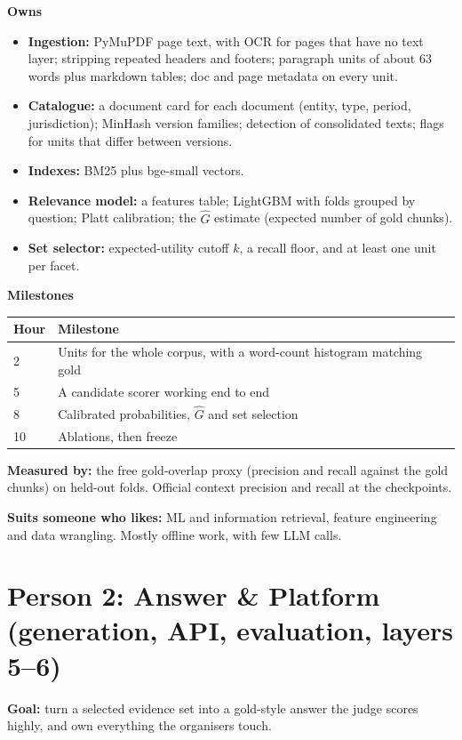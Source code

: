 \documentclass[11pt,a4paper]{article}
\newcommand{\role}[1]{\section*{\color{accent}#1}}
\begin{document}
\textbf{Owns}
\begin{itemize}
  \item \textbf{Ingestion:} PyMuPDF page text, with OCR for pages that have no text layer;
        stripping repeated headers and footers; paragraph units of about 63 words plus markdown
        tables; doc and page metadata on every unit.
  \item \textbf{Catalogue:} a document card for each document (entity, type, period, jurisdiction);
        MinHash version families; detection of consolidated texts; flags for units that differ
        between versions.
  \item \textbf{Indexes:} BM25 plus bge-small vectors.
  \item \textbf{Relevance model:} a features table; LightGBM with folds grouped by question; Platt
        calibration; the $\hat{G}$ estimate (expected number of gold chunks).
  \item \textbf{Set selector:} expected-utility cutoff $k$, a recall floor, and at least one unit
        per facet.
\end{itemize}

\textbf{Milestones}

\begin{tabularx}{\linewidth}{@{}lX@{}}
\toprule
\textbf{Hour} & \textbf{Milestone} \\
\midrule
2  & Units for the whole corpus, with a word-count histogram matching gold \\
5  & A candidate scorer working end to end \\
8  & Calibrated probabilities, $\hat{G}$ and set selection \\
10 & Ablations, then freeze \\
\bottomrule
\end{tabularx}

\textbf{Measured by:} the free gold-overlap proxy (precision and recall against the gold chunks) on
held-out folds. Official context precision and recall at the checkpoints.

\textbf{Suits someone who likes:} ML and information retrieval, feature engineering and data
wrangling. Mostly offline work, with few LLM calls.

\role{Person 2: Answer \& Platform (generation, API, evaluation, layers 5--6)}

\textbf{Goal:} turn a selected evidence set into a gold-style answer the judge scores highly, and
own everything the organisers touch.
\end{document}
